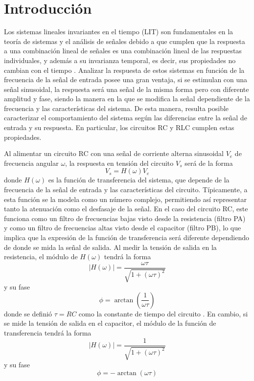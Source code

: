 \section{Introducción}
    Los sistemas lineales invariantes en el tiempo (LIT) son fundamentales en la teoría de sistemas y el análisis de señales debido a que cumplen que la respuesta a una combinación lineal de señales es una combinación lineal de las respuestas individuales, y además a su invarianza temporal, es decir, sus propiedades no cambian con el tiempo \cite{sistemasLIT}. Analizar la respuesta de estos sistemas en función de la frecuencia de la señal de entrada posee una gran ventaja, si se estimulan con una señal sinusoidal, la respuesta será una señal de la misma forma pero con diferente amplitud y fase, siendo la manera en la que se modifica la señal dependiente de la frecuencia y las características del sistema. De esta manera, resulta posible caracterizar el comportamiento del sistema según las diferencias entre la señal de entrada y su respuesta. En particular, los circuitos RC y RLC cumplen estas propiedades.

    Al alimentar un circuito RC con una señal de corriente alterna sinusoidal \(V_e\) de frecuencia angular \(\omega\), la respuesta en tensión del circuito \(V_s\) será de la forma
    \begin{equation}
        V_s = H(\omega) V_e
        \label{cociente}
    \end{equation}
    donde \(H(\omega)\) es la función de transferencia del sistema, que depende de la frecuencia de la señal de entrada y las características del circuito. Típicamente, a esta función se la modela como un número complejo, permitiendo así representar tanto la atenuación como el desfasaje de la señal. En el caso del circuito RC, este funciona como un filtro de frecuencias bajas visto desde la resistencia (filtro PA) y como un filtro de frecuencias altas visto desde el capacitor (filtro PB), lo que implica que la expresión de la función de transferencia será diferente dependiendo de donde se mida la señal de salida. Al medir la tensión de salida en la resistencia, el módulo de \(H(\omega)\) tendrá la forma \cite{oppenheim1997signals}
    \begin{equation}
        |H(\omega)| = \frac{\omega \tau}{\sqrt{1 + (\omega \tau)^2}} 
     \label{PA}
    \end{equation}
    y su fase 
    \begin{equation}
        \phi = \arctan\left(\frac{1}{\omega \tau}\right)
        \label{eq:3}
    \end{equation}
    donde se definió \(\tau = RC\) como la constante de tiempo del circuito \cite{kip1969}. En cambio, si se mide la tensión de salida en el capacitor, el módulo de la función de transferencia tendrá la forma 
    \begin{equation}
        |H(\omega)| = \frac{1}{\sqrt{1 + (\omega \tau)^2}}
        \label{PB}
    \end{equation}
    y su fase
    \begin{equation}
        \phi = -\arctan(\omega \tau)
        \label{eq:4}
    \end{equation}
    
